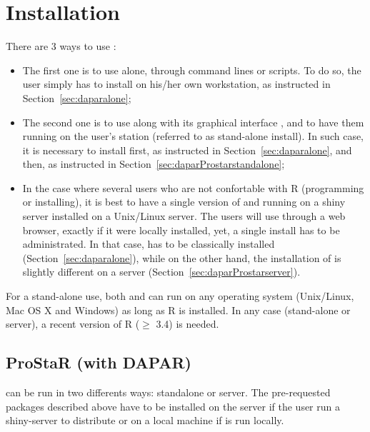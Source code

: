 \documentclass[12pt]{article}
\begin{document}
\section{Installation}\label{sec:install}

There are 3 ways to use :
\begin{itemize}
\item The first one is to use  alone, through command lines or 
scripts. To do so, the user simply has to install  on his/her 
own workstation, as instructed in Section~\ref{sec:daparalone};
\item The second one is to use  along with its graphical 
interface , and to have them running on the user's station 
(referred to as stand-alone install). In such case, it is necessary to install
 first, as instructed in Section~\ref{sec:daparalone}, and
 then, as instructed in 
Section~\ref{sec:daparProstarstandalone};
\item In the case where several  users who are not 
confortable with R (programming or installing), it is best to have a single 
version of  and  running on a shiny server 
installed on a Unix/Linux server. The users will use  through 
a web browser, exactly if it were locally installed, yet, a single install has 
to be administrated. In that case,  has to be classically 
installed (Section~\ref{sec:daparalone}), while on the other hand, the 
installation of  is slightly different on a server 
(Section~\ref{sec:daparProstarserver}).
\end{itemize}
For a stand-alone use, both  and  can run on 
any operating system (Unix/Linux, Mac OS X and Windows) as long as R is 
installed. 
In any case (stand-alone or server), a recent version of R ($\geq$ 3.4) is 
needed.


\subsection{ProStaR (with DAPAR)}\label{sec:daparProstar}

 can be run in two differents ways: standalone or server. The 
pre-requested packages described above have to be installed on the server if 
the user run a shiny-server to distribute  or on a local 
machine if  is run locally.
\end{document}
